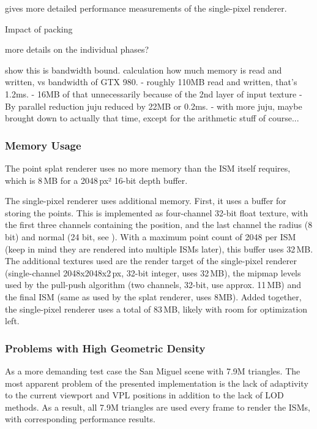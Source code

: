  gives more detailed performance measurements of the single-pixel renderer.

Impact of packing

more details on the individual phases?

show this is bandwidth bound. calculation how much memory is read and written, vs bandwidth of GTX 980.
    - roughly 110MB read and written, that's 1.2ms.
    - 16MB of that unnecessarily because of the 2nd layer of input texture
    - By parallel reduction juju reduced by 22MB or 0.2ms.
    - with more juju, maybe brought down to actually that time, except for the arithmetic stuff of course...


\subsubsection{Memory Usage}

The point splat renderer uses no more memory than the ISM itself requires, which is 8\,MB for a 2048\,px² 16-bit depth buffer.

The single-pixel renderer uses additional memory. First, it uses a buffer for storing the points. This is implemented as four-channel 32-bit float texture, with the first three channels containing the position, and the last channel the radius (8 bit) and normal (24 bit, see \cite{Cigolle:2014:NormalPacking}). With a maximum point count of 2048 per ISM (keep in mind they are rendered into multiple ISMs later), this buffer uses 32\,MB.
The additional textures used are the render target of the single-pixel renderer (single-channel 2048x2048x2\,px, 32-bit integer, uses 32\,MB), the mipmap levels used by the pull-push algorithm (two channels, 32-bit, use approx. 11\,MB) and the final ISM (same as used by the splat renderer, uses 8MB).
Added together, the single-pixel renderer uses a total of 83\,MB, likely with room for optimization left.


\subsubsection{Problems with High Geometric Density}

As a more demanding test case the San Miguel scene with 7.9M triangles. The most apparent problem of the presented implementation is the lack of adaptivity to the current viewport and VPL positions in addition to the lack of LOD methods. As a result, all 7.9M triangles are used every frame to render the ISMs, with corresponding performance results.


